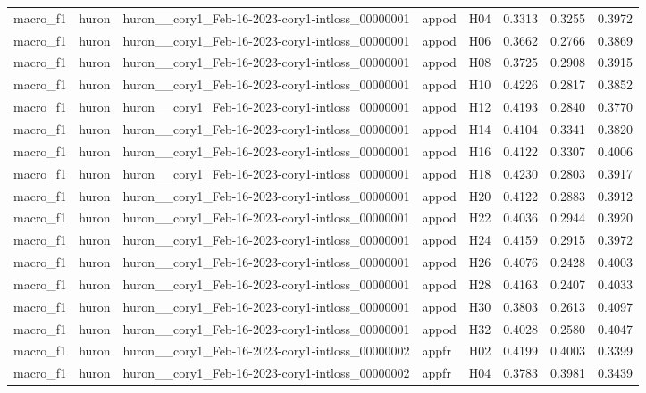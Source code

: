 \begin{table}[tbp]
\begin{tabular}{lllllrrr}
macro\_f1 & huron & huron\_\_cory1\_Feb-16-2023-cory1-intloss\_00000001 & appod & H04 & 0.3313 & 0.3255 & 0.3972 \\
macro\_f1 & huron & huron\_\_cory1\_Feb-16-2023-cory1-intloss\_00000001 & appod & H06 & 0.3662 & 0.2766 & 0.3869 \\
macro\_f1 & huron & huron\_\_cory1\_Feb-16-2023-cory1-intloss\_00000001 & appod & H08 & 0.3725 & 0.2908 & 0.3915 \\
macro\_f1 & huron & huron\_\_cory1\_Feb-16-2023-cory1-intloss\_00000001 & appod & H10 & 0.4226 & 0.2817 & 0.3852 \\
macro\_f1 & huron & huron\_\_cory1\_Feb-16-2023-cory1-intloss\_00000001 & appod & H12 & 0.4193 & 0.2840 & 0.3770 \\
macro\_f1 & huron & huron\_\_cory1\_Feb-16-2023-cory1-intloss\_00000001 & appod & H14 & 0.4104 & 0.3341 & 0.3820 \\
macro\_f1 & huron & huron\_\_cory1\_Feb-16-2023-cory1-intloss\_00000001 & appod & H16 & 0.4122 & 0.3307 & 0.4006 \\
macro\_f1 & huron & huron\_\_cory1\_Feb-16-2023-cory1-intloss\_00000001 & appod & H18 & 0.4230 & 0.2803 & 0.3917 \\
macro\_f1 & huron & huron\_\_cory1\_Feb-16-2023-cory1-intloss\_00000001 & appod & H20 & 0.4122 & 0.2883 & 0.3912 \\
macro\_f1 & huron & huron\_\_cory1\_Feb-16-2023-cory1-intloss\_00000001 & appod & H22 & 0.4036 & 0.2944 & 0.3920 \\
macro\_f1 & huron & huron\_\_cory1\_Feb-16-2023-cory1-intloss\_00000001 & appod & H24 & 0.4159 & 0.2915 & 0.3972 \\
macro\_f1 & huron & huron\_\_cory1\_Feb-16-2023-cory1-intloss\_00000001 & appod & H26 & 0.4076 & 0.2428 & 0.4003 \\
macro\_f1 & huron & huron\_\_cory1\_Feb-16-2023-cory1-intloss\_00000001 & appod & H28 & 0.4163 & 0.2407 & 0.4033 \\
macro\_f1 & huron & huron\_\_cory1\_Feb-16-2023-cory1-intloss\_00000001 & appod & H30 & 0.3803 & 0.2613 & 0.4097 \\
macro\_f1 & huron & huron\_\_cory1\_Feb-16-2023-cory1-intloss\_00000001 & appod & H32 & 0.4028 & 0.2580 & 0.4047 \\
macro\_f1 & huron & huron\_\_cory1\_Feb-16-2023-cory1-intloss\_00000002 & appfr & H02 & 0.4199 & 0.4003 & 0.3399 \\
macro\_f1 & huron & huron\_\_cory1\_Feb-16-2023-cory1-intloss\_00000002 & appfr & H04 & 0.3783 & 0.3981 & 0.3439 \\

\end{tabular}
\end{table}
